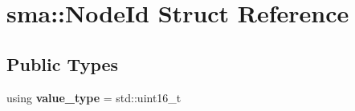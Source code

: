 \hypertarget{structsma_1_1NodeId}{\section{sma\-:\-:Node\-Id Struct Reference}
\label{structsma_1_1NodeId}
}
\subsection*{Public Types}
\begin{DoxyCompactItemize}
\item 
\hypertarget{structsma_1_1NodeId_a9f433208c6dc97683dd46bdc119d3d16}{using {\bfseries value\-\_\-type} = std\-::uint16\-\_\-t}\label{structsma_1_1NodeId_a9f433208c6dc97683dd46bdc119d3d16}

\end{DoxyCompactItemize}
